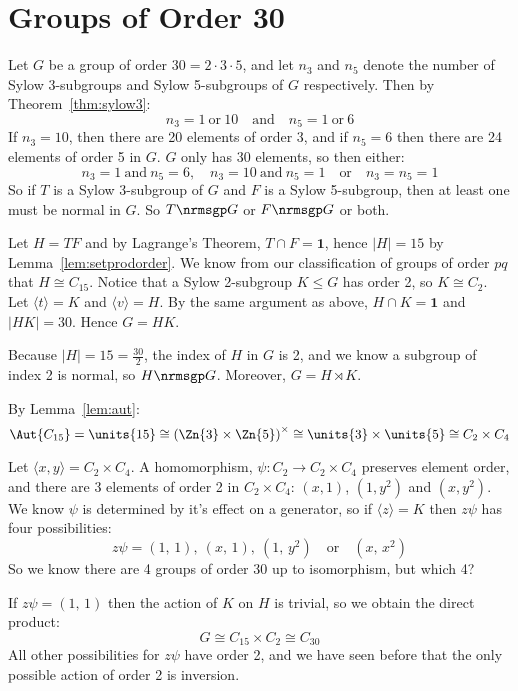 \section{Groups of Order 30}
Let \(G\) be a group of order \(30 = 2 \cdot 3 \cdot 5\), and let \(n_3\) and \(n_5\) denote the number of Sylow
3-subgroups and Sylow 5-subgroups of \(G\) respectively.
Then by Theorem~\ref{thm:sylow3}:
\[n_3 = 1 \ \text{or} \ 10 \quad \text{and} \quad n_5 = 1 \ \text{or} \ 6\]
If \(n_3 = 10\), then there are 20 elements of order 3, and if \(n_5 = 6\) then
there are 24 elements of order 5 in \(G\).
\(G\) only has 30 elements, so then either:
\[n_3 = 1 \ \text{and} \ n_5 = 6, \quad n_3 = 10 \ \text{and} \ n_5 = 1 \quad \text{or} \quad n_3 = n_5 = 1\]
So if \(T\) is a Sylow 3-subgroup of \(G\) and \(F\) is a Sylow 5-subgroup, then at least one must be normal in \(G\).
So \(T \nrmsgp G\) or \(F \nrmsgp G\) or both.

Let \(H = TF\) and by Lagrange's Theorem, \(T \cap F = \bm{1}\), hence \(|H| = 15\) by Lemma~\ref{lem:setprodorder}.
We know from our classification of groups of order \(pq\) that \(H \cong C_{15}\).
Notice that a Sylow 2-subgroup \(K \leqslant G\) has order 2, so \(K \cong C_2\).
Let \(\langle t \rangle = K\) and \(\langle v \rangle = H\).
By the same argument as above, \(H \cap K = \bm{1}\) and \(|HK| = 30\).
Hence \(G = HK\).

Because \(|H| = 15 = \frac{30}{2}\), the index of \(H\) in \(G\) is 2, and we know a subgroup of index 2 is normal, so
\(H \nrmsgp G\).
Moreover, \(G = H \rtimes K\).

By Lemma~\ref{lem:aut}:
\[\Aut{C_{15}} = \units{15} \cong {(\Zn{3} \times \Zn{5})}^\times \cong \units{3} \times \units{5} \cong C_2 \times C_4\]

Let \(\langle x, y \rangle = C_2 \times C_4\).
A homomorphism, \(\psi:C_2 \to C_2 \times C_4\) preserves element order, and there are 3 elements of order 2 in \(C_2
\times C_4\): \((x, 1)\), \((1, y^2)\) and \((x, y^2)\).
We know \(\psi\) is determined by it's effect on a generator, so if \(\langle z \rangle = K\) then \(z\psi\) has four
possibilities:
\[z\psi = (1,\,1),\ (x,\,1),\ (1,\,y^2) \quad \text{or} \quad (x,\,x^2)\]
So we know there are 4 groups of order 30 up to isomorphism, but which 4?

If \(z\psi = (1,\,1)\) then the action of \(K\) on \(H\) is trivial, so we obtain the direct product:
\[G \cong C_{15} \times C_2 \cong C_{30}\]
All other possibilities for \(z\psi\) have order 2, and we have seen before that the only possible action of order 2 is
inversion.

